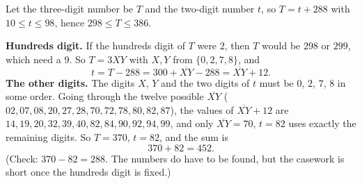 Let the three-digit number be $T$ and the two-digit number $t$, so $T=t+288$ with $10\le t\le98$, hence $298\le T\le386$.

\textbf{Hundreds digit.} If the hundreds digit of $T$ were $2$, then $T$ would be $298$ or $299$, which need a $9$. So $T=3XY$ with $X,Y$ from $\{0,2,7,8\}$, and
\[
t=T-288=300+\overline{XY}-288=\overline{XY}+12 .
\]
\textbf{The other digits.} The digits $X$, $Y$ and the two digits of $t$ must be $0$, $2$, $7$, $8$ in some order. Going through the twelve possible $\overline{XY}$ ($02,07,08,20,27,28,70,72,78,80,82,87$), the values of $\overline{XY}+12$ are $14,19,20,32,39,40,82,84,90,92,94,99$, and only $\overline{XY}=70$, $t=82$ uses exactly the remaining digits. So $T=370$, $t=82$, and the sum is
\[
370+82=\boxed{452}.
\]
(Check: $370-82=288$. The numbers do have to be found, but the casework is short once the hundreds digit is fixed.)

